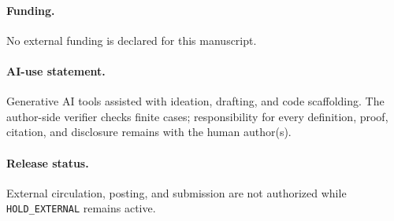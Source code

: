 \documentclass[a4paper,10pt]{amsart}
\theoremstyle{remark}
\begin{document}
\paragraph{Funding.} No external funding is declared for this manuscript.
\paragraph{AI-use statement.} Generative AI tools assisted with ideation,
drafting, and code scaffolding.  The author-side verifier checks finite cases;
responsibility for every definition, proof, citation, and disclosure remains
with the human author(s).
\paragraph{Release status.} External circulation, posting, and submission are
not authorized while \texttt{HOLD\_EXTERNAL} remains active.



\end{document}
